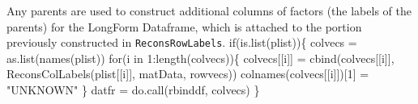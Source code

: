\documentclass[a4paper]{article}
\begin{document}
Any parents are used to construct additional columns of factors (the
labels of the parents) for the LongForm Dataframe, which is attached
to the portion previously constructed in \verb|ReconsRowLabels|.
\nwenddocs{}\endmoddef
if(is.list(plist))\{
  colvecs = as.list(names(plist))
  for(i in 1:length(colvecs))\{
    colvecs[[i]] = cbind(colvecs[[i]],
             ReconsColLabels(plist[[i]], matData, rowvecs))
    colnames(colvecs[[i]])[1] = "UNKNOWN"
  \}
  datfr = do.call(rbinddf, colvecs)
\}
\nwendcode{}\nwdocspar
\end{document}
